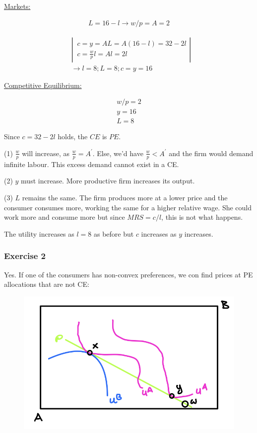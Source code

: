 {{\begin{enumerate}[label=(\alph*)]
{\underline{Markets:}

\begin{align*}
    L=16-l \longrightarrow w / p=A=2
\end{align*}

$$
\begin{aligned}
& \left\lvert\, \begin{array}{l}
c=y=A L=A(16-l)=32-2 l \\
c=\frac{w}{p}l=A l=2 l
\end{array}\right\rvert\, \\
& \longrightarrow l=8 ; L=8 ; c=y=16
\end{aligned}
$$

\underline{Competitive Equilibrium:}

\begin{align*}
    w / p=2 \\
    y=16 \\
    L=8
\end{align*}

Since $c=32-2 l$ holds, the $C E$ is $P E$.
}
{\item 
(1) $\frac{w}{p}$ will increase, as $\frac{w}{p}=A^{\prime}$. Else, we'd have $\frac{w}{p}<A^{\prime}$ and the firm would demand infinite labour. This excess demand cannot exist in a CE.

(2) $y$ must increase. More productive firm increases its output.

(3) $L$ remains the same. The firm produces more at a lower price and the consumer consumes more, working the same for a higher relative wage. She could work more and consume more but since $MRS =c / l$, this is not what happens.

The utility increases as $l=8$ as before but $c$ increases as $y$ increases.
}
\end{enumerate}
}
{
\subsubsection*{Exercise 2}
Yes. If one of the consumers has non-convex preferences, we con find prices at PE allocations that are not CE:

\begin{figure}[!htp]
    \centering
    \includegraphics[width=.75\textwidth]{images/2020_21_2.png}
\end{figure}

}}

